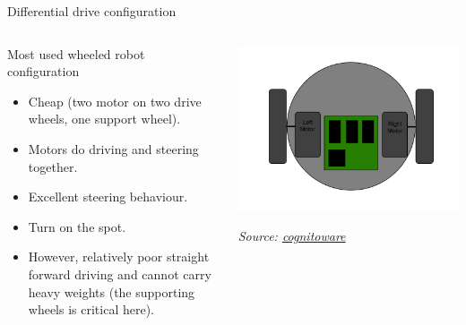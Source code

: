 \documentclass[compress]{beamer}
\newcommand{\source}[2]{{\tiny\it Source: \href{#1}{#2}}}
\begin{document}
\begin{frame}{Differential drive configuration}

    \begin{columns}
        \begin{column}{0.6\linewidth}

            Most used wheeled robot configuration

            \begin{itemize}
                \item Cheap (two motor on two drive wheels, one support wheel).
                \item Motors do driving and steering together.
                \item Excellent steering behaviour.
                \item Turn on the spot.
                \item However, relatively poor straight forward driving and cannot carry
                    heavy weights (the supporting wheels is critical here).
            \end{itemize}
        \end{column}
        \begin{column}{0.4\linewidth}

        \begin{center}
            \includegraphics[width=0.8\linewidth]{differentialdrive}

            \source{cognitoware.com}{cognitoware}
        \end{center}
        \end{column}
    \end{columns}

\end{frame}
\end{document}
